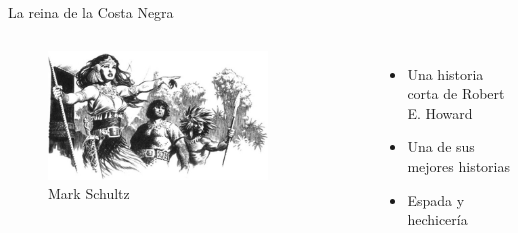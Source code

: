 \begin{frame}{}
	\maketitle
\end{frame}
\note[itemize]{
	\item
}

\begin{frame}{La reina de la Costa Negra}
	\begin{columns}
		\begin{figure}[htb]
			\centering
			\includegraphics[width=0.8\textwidth]{img/Intro}
			\caption{Mark Schultz}
		\end{figure}
		\begin{itemize}
			\item Una historia corta de Robert E. Howard
			\item Una de sus mejores historias
			\item Espada y hechicería
		\end{itemize}
	\end{columns}
\end{frame}
\note[itemize]{
	\item
}


